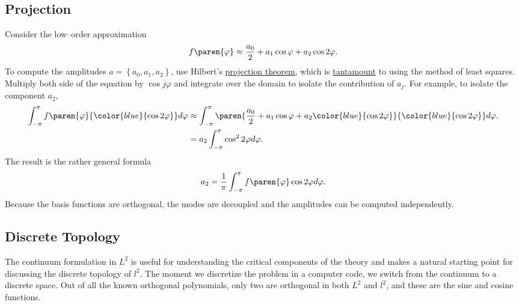 \subsection{Projection}
Consider the low--order approximation 
%
\begin{equation}
	f\paren{\varphi}  \approx \frac{a_{0}}{2}  + a_{1} \cos \varphi +  a_{2} \cos 2\varphi.
\end{equation}
%
To compute the amplitudes $a=\left\{a_{0}, a_{1}, a_{2} \right\}$, use Hilbert's \href{https://en.wikipedia.org/wiki/Hilbert_projection_theorem}{projection theorem}, which is \href{http://www.kris-nimark.net/pdf/ProjectionTheorem.pdf}{tantamount} to using the method of least squares. Multiply both side of the equation by $\cos j \varphi$ and integrate over the domain to isolate the contribution of $a_{j}$. For example, to isolate the component $a_{2}$,
%
\begin{equation}
	\begin{split}
		\int_{-\pi}^{\pi}{ f\paren{\varphi}  {\color{blue}{\cos 2\varphi }}} d\varphi  
			&\approx \int_{-\pi}^{\pi}{ \paren{\frac{a_{0}}{2}  + a_{1} \cos \varphi +  a_{2} {\color{blue}{\cos 2\varphi}} } {\color{blue}{\cos 2\varphi}}} d\varphi. \\
			&= a_{2} \int_{-\pi}^{\pi}{ \cos^{2} 2\varphi } d\varphi. \\
	\end{split}
\end{equation}
%
The result is the rather general formula
\begin{equation}
	a_{2} = \frac{1}{\pi} \int_{-\pi}^{\pi} f\paren{\varphi} \cos 2\varphi d\varphi.
\end{equation}
Because the basis functions are orthogonal, the modes are decoupled and the amplitudes can be computed independently.

\subsection{Discrete Topology}
The continuum formulation in $L^{2}$ is useful for understanding the critical components of the theory and makes a natural starting point for discussing the discrete topology of $l^{2}$. The moment we discretize the problem in a computer code, we switch from the continuum to a discrete space. Out of all the known orthogonal polynomials, only two are orthogonal in both $L^{2}$ and $l^{2}$, and these are the sine and cosine functions. 

